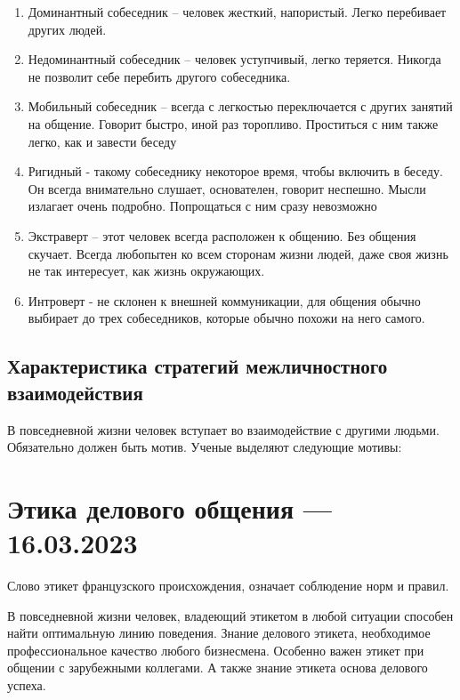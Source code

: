 \documentclass[a4paper,14pt]{extarticle}
\begin{document}
\begin{enumerate}
    \item Доминантный собеседник – человек жесткий, напористый. Легко перебивает других людей.
    \item Недоминантный собеседник – человек уступчивый, легко теряется. Никогда не позволит себе перебить другого собеседника.
    \item Мобильный собеседник – всегда с легкостью переключается с других занятий на общение. Говорит быстро, иной раз торопливо. Проститься с ним также легко, как и завести беседу
    \item Ригидный - такому собеседнику некоторое время, чтобы включить в беседу. Он всегда внимательно слушает, основателен, говорит неспешно. Мысли излагает очень подробно. Попрощаться с ним сразу невозможно
    \item Экстраверт – этот человек всегда расположен к общению. Без общения скучает. Всегда любопытен ко всем сторонам жизни людей, даже своя жизнь не так интересует, как жизнь окружающих.
    \item Интроверт - не склонен к внешней коммуникации, для общения обычно выбирает до трех собеседников, которые обычно похожи на него самого.
\end{enumerate}

\subsection{Характеристика стратегий межличностного взаимодействия}

В повседневной жизни человек вступает во взаимодействие с другими людьми. Обязательно должен быть мотив. Ученые выделяют следующие мотивы:

\begin{multienumerate}
\end{multienumerate}

\section{Этика делового общения — 16.03.2023}

Слово этикет французского происхождения, означает соблюдение норм
и правил.

В повседневной жизни человек, владеющий этикетом в любой ситуации
способен найти оптимальную линию поведения. Знание делового этикета, необходимое профессиональное качество любого бизнесмена. Особенно важен этикет при общении с зарубежными коллегами. А также знание этикета основа делового успеха.
\end{document}
